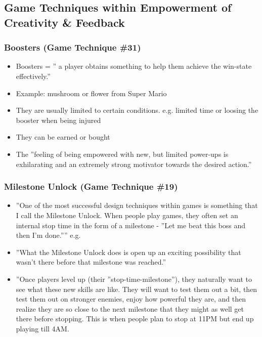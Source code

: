 \subsection{Game Techniques within Empowerment of Creativity \& Feedback}

\subsubsection{Boosters (Game Technique \#31)}
    \begin{itemize}
        \item Boosters = '' a player obtains something to help them achieve the win-state effectively.''
        \item Example: mushroom or flower from Super Mario
        \item They are usually limited to certain conditions. e.g. limited time or loosing the booster when being injured
        \item They can be earned or bought
        \item The ''feeling of being empowered with new, but limited power-ups is exhilarating and an extremely strong motivator towards the desired action.''
    \end{itemize}
    
\subsubsection{Milestone Unlock (Game Technique \#19)}
\begin{itemize}
    \item ''One of the most successful design techniques within games is something that I call the Milestone Unlock. When people play games, they often set an internal stop time in the form of a milestone - ''Let me beat this boss and then I'm done.'''' e.g.
    \item ''What the Milestone Unlock does is open up an exciting possibility that wasn't there before that milestone was reached.''
    \item ''Once players level up (their ''stop-time-milestone''), they naturally want to see what these new skills are like. They will want to test them out a bit, then test them out on stronger enemies, enjoy how powerful they are, and then realize they are so close to the next milestone that they might as well get there before stopping. This is when people plan to stop at 11PM but end up playing till 4AM.
\end{itemize}

